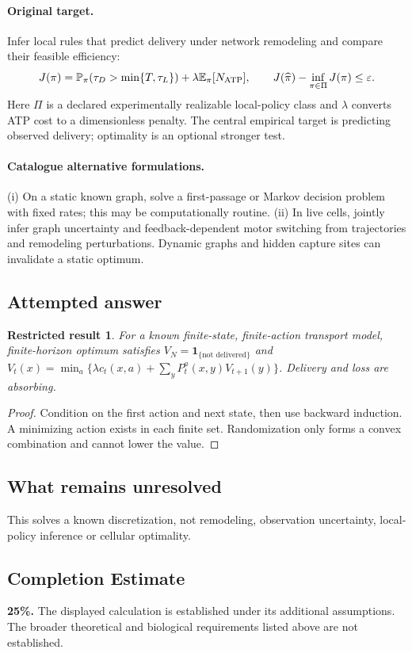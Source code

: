 \documentclass[11pt]{article}
\newcommand{\E}{\mathbb E}
\newcommand{\Prob}{\mathbb P}
\providecommand{\E}{\mathbb E}
\providecommand{\Prob}{\mathbb P}
\newtheorem{attemptresult}{Restricted result}[section]
\begin{document}
\paragraph{Original target.}
Infer local rules that predict delivery under network remodeling and compare their feasible efficiency:
\[
J(\pi)=\Prob_\pi(\tau_D>\min\{T,\tau_L\})+
\lambda\E_\pi[N_{\rm ATP}],\qquad
J(\widehat\pi)-\inf_{\pi\in\Pi}J(\pi)\leq\varepsilon.
\]
Here $\Pi$ is a declared experimentally realizable local-policy class and $\lambda$ converts ATP cost to a dimensionless penalty. The central empirical target is predicting observed delivery; optimality is an optional stronger test.
\paragraph{Catalogue alternative formulations.}
(i) On a static known graph, solve a first-passage or Markov decision problem with fixed rates; this may be computationally routine. (ii) In live cells, jointly infer graph uncertainty and feedback-dependent motor switching from trajectories and remodeling perturbations. Dynamic graphs and hidden capture sites can invalidate a static optimum.
\subsection{Attempted answer}
\begin{attemptresult}
For a known finite-state, finite-action transport model, finite-horizon optimum satisfies $V_N=\mathbf1_{\{\text{not delivered}\}}$ and $V_t(x)=\min_a\{\lambda c_t(x,a)+\sum_yP_t^a(x,y)V_{t+1}(y)\}$. Delivery and loss are absorbing.
\end{attemptresult}
\begin{proof}
Condition on the first action and next state, then use backward induction. A minimizing action exists in each finite set. Randomization only forms a convex combination and cannot lower the value.
\end{proof}
\subsection{What remains unresolved}
This solves a known discretization, not remodeling, observation uncertainty, local-policy inference or cellular optimality.
\subsection{Completion Estimate}
\textbf{25\%.} The displayed calculation is established under its additional assumptions. The broader theoretical and biological requirements listed above are not established.
\end{document}
